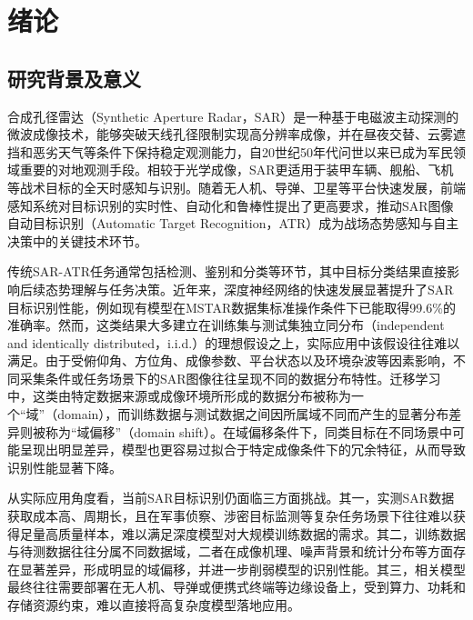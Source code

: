\chapter{绪论}


\section{研究背景及意义}
合成孔径雷达（Synthetic Aperture Radar，SAR）是一种基于电磁波主动探测的微波成像技术，能够突破天线孔径限制实现高分辨率成像，并在昼夜交替、云雾遮挡和恶劣天气等条件下保持稳定观测能力，自20世纪50年代问世以来已成为军民领域重要的对地观测手段\cite{ref-1-1,李春升2019高分辨率星载,el2013target}。相较于光学成像，SAR更适用于装甲车辆、舰船、飞机等战术目标的全天时感知与识别。随着无人机、导弹、卫星等平台快速发展，前端感知系统对目标识别的实时性、自动化和鲁棒性提出了更高要求，推动SAR图像自动目标识别（Automatic Target Recognition，ATR）成为战场态势感知与自主决策中的关键技术环节\cite{el2013target,kechagias2021automatic}。

传统SAR-ATR任务通常包括检测、鉴别和分类等环节，其中目标分类结果直接影响后续态势理解与任务决策\cite{罗汝2023sar,何奇山2024面向}。近年来，深度神经网络的快速发展显著提升了SAR目标识别性能，例如现有模型在MSTAR数据集标准操作条件下已能取得99.6\%的准确率\cite{li2023hierarchical}。然而，这类结果大多建立在训练集与测试集独立同分布（independent and identically distributed，i.i.d.）的理想假设之上，实际应用中该假设往往难以满足。由于受俯仰角、方位角、成像参数、平台状态以及环境杂波等因素影响，不同采集条件或任务场景下的SAR图像往往呈现不同的数据分布特性。迁移学习中，这类由特定数据来源或成像环境所形成的数据分布被称为一个“域”（domain），而训练数据与测试数据之间因所属域不同而产生的显著分布差异则被称为“域偏移”（domain shift）\cite{zhuang2020comprehensive}。在域偏移条件下，同类目标在不同场景中可能呈现出明显差异，模型也更容易过拟合于特定成像条件下的冗余特征，从而导致识别性能显著下降。

从实际应用角度看，当前SAR目标识别仍面临三方面挑战。其一，实测SAR数据获取成本高、周期长，且在军事侦察、涉密目标监测等复杂任务场景下往往难以获得足量高质量样本，难以满足深度模型对大规模训练数据的需求\cite{yang2024transfer,何奇山2024面向}。其二，训练数据与待测数据往往分属不同数据域，二者在成像机理、噪声背景和统计分布等方面存在显著差异，形成明显的域偏移，并进一步削弱模型的识别性能\cite{yang2024transfer}。其三，相关模型最终往往需要部署在无人机、导弹或便携式终端等边缘设备上，受到算力、功耗和存储资源约束，难以直接将高复杂度模型落地应用\cite{xu2022lite}。

